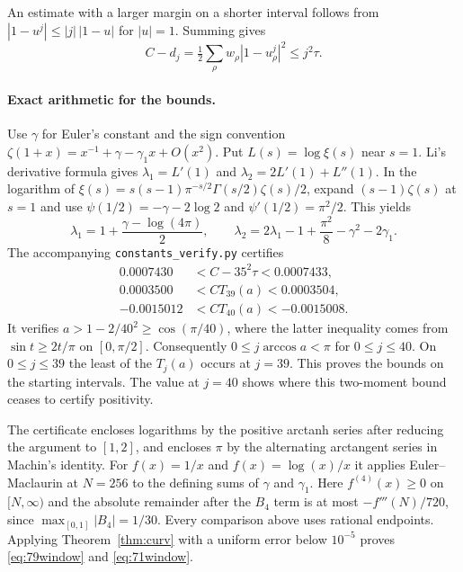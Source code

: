 An estimate with a larger margin on a shorter interval follows from
$|1-u^j|\le |j|\,|1-u|$ for $|u|=1$. Summing gives
\[
 C-d_j=\tfrac12\sum_\rho w_\rho |1-u_\rho^j|^2
       \le j^2\tau .
\]

\paragraph{Exact arithmetic for the bounds.}
Use $\gamma$ for Euler's constant and the sign convention
$\zeta(1+x)=x^{-1}+\gamma-\gamma_1 x+O(x^2)$. Put
$L(s)=\log\xi(s)$ near $s=1$. Li's derivative formula gives
$\lambda_1=L'(1)$ and $\lambda_2=2L'(1)+L''(1)$. In the logarithm
of $\xi(s)=s(s-1)\pi^{-s/2}\Gamma(s/2)\zeta(s)/2$, expand
$(s-1)\zeta(s)$ at $s=1$ and use
$\psi(1/2)=-\gamma-2\log 2$ and $\psi'(1/2)=\pi^2/2$. This yields
\[
 \lambda_1=1+\frac{\gamma-\log(4\pi)}{2},\qquad
 \lambda_2=2\lambda_1-1+\frac{\pi^2}{8}-\gamma^2-2\gamma_1.
\]
The accompanying \texttt{constants\_verify.py} certifies
\begin{align*}
 0.0007430 &< C-35^2\tau < 0.0007433,\\
 0.0003500 &< C T_{39}(a) < 0.0003504,\\
 -0.0015012 &< C T_{40}(a) < -0.0015008 .
\end{align*}
It verifies $a>1-2/40^2\ge\cos(\pi/40)$, where the latter inequality
comes from $\sin t\ge2t/\pi$ on $[0,\pi/2]$. Consequently
$0\le j\arccos a<\pi$ for $0\le j\le40$. On $0\le j\le39$ the
least of the $T_j(a)$ occurs at $j=39$. This proves the bounds on the
starting intervals. The value at $j=40$ shows where this two-moment
bound ceases to certify positivity.

The certificate encloses logarithms by the positive arctanh series
after reducing the argument to $[1,2]$, and encloses $\pi$ by the
alternating arctangent series in Machin's identity. For $f(x)=1/x$
and $f(x)=\log(x)/x$ it applies Euler--Maclaurin at $N=256$ to the
defining sums of $\gamma$ and $\gamma_1$. Here $f^{(4)}(x)\ge0$ on
$[N,\infty)$ and the absolute remainder after the $B_4$ term is at
most $-f'''(N)/720$, since $\max_{[0,1]}|B_4|=1/30$. Every
comparison above uses rational endpoints. Applying
Theorem~\ref{thm:curv} with a uniform error below $10^{-5}$ proves
\eqref{eq:79window} and \eqref{eq:71window}.

